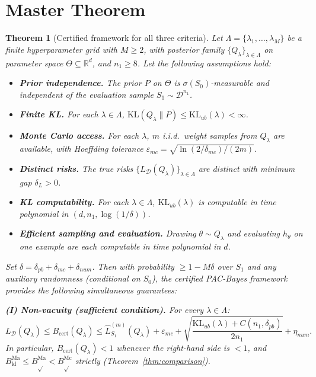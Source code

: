 \documentclass[11pt,a4paper]{article}
\newtheorem{theorem}{Theorem}
\newcommand{\kl}{\mathrm{kl}}
\newcommand{\KL}{\mathrm{KL}}
\newcommand{\cD}{\mathcal{D}}
\newcommand{\R}{\mathbb{R}}
\begin{document}
\section{Master Theorem}

\begin{theorem}[Certified framework for all three criteria]
\label{thm:master}
Let $\Lambda = \{\lambda_1, \dots, \lambda_M\}$ be a finite hyperparameter grid with $M \ge 2$, with posterior family $\{Q_\lambda\}_{\lambda \in \Lambda}$ on parameter space $\Theta \subseteq \R^d$, and $n_1 \ge 8$. Let the following assumptions hold:
\begin{itemize}
    \item[\textup{(A1)}] \textbf{Prior independence.} The prior $P$ on $\Theta$ is $\sigma(S_0)$-measurable and independent of the evaluation sample $S_1 \sim \cD^{n_1}$.
    \item[\textup{(A2)}] \textbf{Finite KL.} For each $\lambda \in \Lambda$, $\KL(Q_\lambda \| P) \le \KL_{ub}(\lambda) < \infty$.
    \item[\textup{(A3)}] \textbf{Monte Carlo access.} For each $\lambda$, $m$ i.i.d.\ weight samples from $Q_\lambda$ are available, with Hoeffding tolerance $\varepsilon_{mc} = \sqrt{\ln(2/\delta_{mc})/(2m)}$.
    \item[\textup{(A4)}] \textbf{Distinct risks.} The true risks $\{L_\cD(Q_\lambda)\}_{\lambda \in \Lambda}$ are distinct with minimum gap $\delta_L > 0$.
    \item[\textup{(A5)}] \textbf{KL computability.} For each $\lambda \in \Lambda$, $\KL_{ub}(\lambda)$ is computable in time polynomial in $(d, n_1, \log(1/\delta))$.
    \item[\textup{(A6)}] \textbf{Efficient sampling and evaluation.} Drawing $\theta \sim Q_\lambda$ and evaluating $h_\theta$ on one example are each computable in time polynomial in $d$.
\end{itemize}
Set $\delta = \delta_{pb} + \delta_{mc} + \delta_{num}$. Then with probability $\ge 1 - M\delta$ over $S_1$ and any auxiliary randomness (conditional on $S_0$), the certified PAC-Bayes framework provides the following simultaneous guarantees:

\medskip

\noindent\textbf{(I) Non-vacuity (sufficient condition).} For every $\lambda \in \Lambda$:
\[
L_\cD(Q_\lambda) \le B_{\mathrm{cert}}(Q_\lambda) \le \hat{L}_{S_1}^{(m)}(Q_\lambda) + \varepsilon_{mc} + \sqrt{\frac{\KL_{ub}(\lambda) + C(n_1, \delta_{pb})}{2n_1}} + \eta_{num}.
\]
In particular, $B_{\mathrm{cert}}(Q_\lambda) < 1$ whenever the right-hand side is $< 1$, and $B_{\kl}^{\mathrm{Ma}} \le B_{\sqrt{}}^{\mathrm{Ma}} < B_{\sqrt{}}^{\mathrm{Mc}}$ strictly (Theorem~\ref{thm:comparison}).


\end{theorem}
\end{document}
